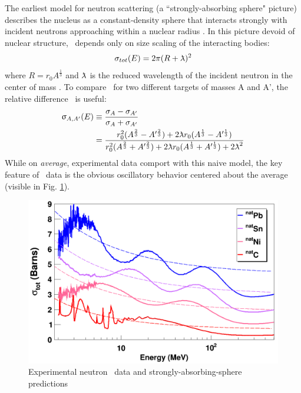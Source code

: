The earliest model for neutron scattering (a ``strongly-absorbing sphere"
picture) describes the nucleus as a constant-density sphere that interacts
strongly with incident neutrons approaching within a nuclear radius
\cite{Feshbach1949}. In this picture devoid of nuclear structure, \tot\ depends
only on size scaling of the interacting bodies:
\begin{equation} \label{SASAbsolute}
    \sigma_{tot}(E) = 2\pi(R + \lambdabar)^{2}
\end{equation}
where $R=r_{0}A^{\frac{1}{3}}$ and $\lambdabar$ is the reduced wavelength
of the incident neutron in the center of mass \cite{Fernbach1949, Satchler1980}. 
To compare \tot\ for two different targets of masses A and A', the relative
difference \totRD\ is useful:
\begin{equation} \label{SASRelDiff}
    \begin{split}
        \totRD & \equiv
    \frac{\sigma_{A}-\sigma_{A'}}{\sigma_{A}+\sigma_{A'}} \\
    & =
    \frac{r_{0}^{2}(A^{\frac{2}{3}}-A'^{\frac{2}{3}}) +
    2\lambdabar r_{0}(A^{\frac{1}{3}}-A'^{\frac{1}{3}})}
    {r_{0}^{2}(A^{\frac{2}{3}}+A'^{\frac{2}{3}}) +
    2\lambdabar r_{0}(A^{\frac{1}{3}}+A'^{\frac{1}{3}}) + 2\lambdabar^{2}}
    \end{split}
\end{equation}
While on \textit{average}, experimental data comport with this naive
model, the key feature of \tot\ data is the obvious oscillatory
behavior centered about the average (visible in Fig.
\ref{SASphereVsExperiment}).

\begin{figure}
    \includegraphics[scale=0.3]{figures/SASphereVsExperiment.png}
    \caption{Experimental neutron \tot\ data and strongly-absorbing-sphere predictions}
    \label{SASphereVsExperiment}
\end{figure}


